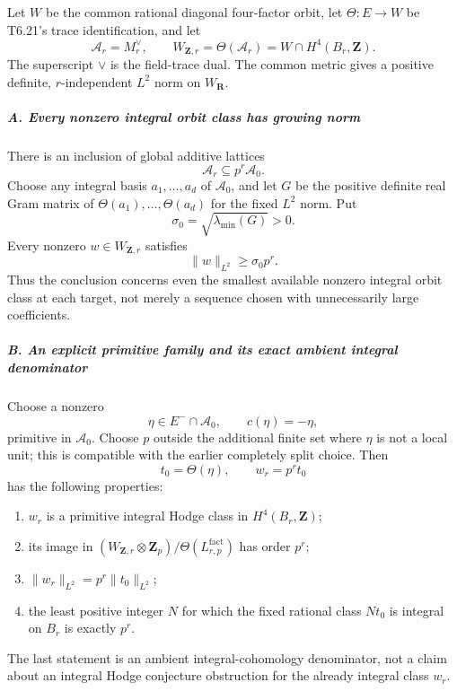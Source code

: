 \documentclass[11pt,a4paper]{article}
\providecommand{\tightlist}{\setlength{\itemsep}{0pt}\setlength{\parskip}{0pt}}
\theoremstyle{definition}
\begin{document}
Let \(W\) be the common rational diagonal four-factor orbit, let \(\Theta:E\to W\) be T6.21's trace identification, and let \[
 \mathcal A_r=M_r^\vee,\qquad
 W_{\mathbf Z,r}=\Theta(\mathcal A_r)
                =W\cap H^4(B_r,\mathbf Z).
 \tag{T23.2}
\] The superscript \(\vee\) is the field-trace dual. The common metric gives a positive definite, \(r\)-independent \(L^2\) norm on \(W_{\mathbf R}\).

\subparagraph{A. Every nonzero integral orbit class has growing norm}\label{a.-every-nonzero-integral-orbit-class-has-growing-norm}

There is an inclusion of global additive lattices \[
 \mathcal A_r\subseteq p^r\mathcal A_0.
 \tag{T23.3}
\] Choose any integral basis \(a_1,\ldots,a_d\) of \(\mathcal A_0\), and let \(G\) be the positive definite real Gram matrix of \(\Theta(a_1),\ldots,\Theta(a_d)\) for the fixed \(L^2\) norm. Put \[
 \sigma_0=\sqrt{\lambda_{\min}(G)}>0.
 \tag{T23.4}
\] Every nonzero \(w\in W_{\mathbf Z,r}\) satisfies \[
 \|w\|_{L^2}\ge \sigma_0 p^r.
 \tag{T23.5}
\] Thus the conclusion concerns even the smallest available nonzero integral orbit class at each target, not merely a sequence chosen with unnecessarily large coefficients.

\subparagraph{B. An explicit primitive family and its exact ambient integral denominator}\label{b.-an-explicit-primitive-family-and-its-exact-ambient-integral-denominator}

Choose a nonzero \[
 \eta\in E^-\cap\mathcal A_0,\qquad c(\eta)=-\eta,
\] primitive in \(\mathcal A_0\). Choose \(p\) outside the additional finite set where \(\eta\) is not a local unit; this is compatible with the earlier completely split choice. Then \[
 t_0=\Theta(\eta),\qquad w_r=p^r t_0
 \tag{T23.6}
\] has the following properties:

\begin{enumerate}
\def\labelenumi{\arabic{enumi}.}
\tightlist
\item
  \(w_r\) is a primitive integral Hodge class in \(H^4(B_r,\mathbf Z)\);
\item
  its image in \((W_{\mathbf Z,r}\otimes\mathbf Z_p)/\Theta(L^{\mathrm{fact}}_{r,p})\) has order \(p^r\);
\item
  \(\|w_r\|_{L^2}=p^r\|t_0\|_{L^2}\);
\item
  the least positive integer \(N\) for which the fixed rational class \(Nt_0\) is integral on \(B_r\) is exactly \(p^r\).
\end{enumerate}

The last statement is an ambient integral-cohomology denominator, not a claim about an integral Hodge conjecture obstruction for the already integral class \(w_r\).
\end{document}
